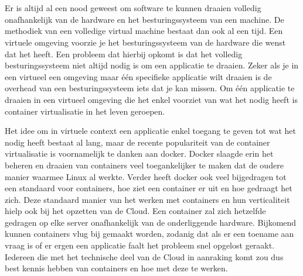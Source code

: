 
\chapter{}
\label{ch:inleiding}

Er is altijd al een nood geweest om software te kunnen draaien volledig onafhankelijk van de hardware en het besturingssysteem van een machine. De methodiek van een volledige virtual machine bestaat dan ook al een tijd. Een virtuele omgeving voorzie je het besturingssysteem van de hardware die wenst dat het heeft. Een probleem dat hierbij opkomt is dat het volledig besturingssysteem niet altijd nodig is om een applicatie te draaien.  Zeker als je in een virtueel een omgeving maar één specifieke applicatie wilt draaien is de overhead van een besturingssysteem iets dat je kan missen.  Om één applicatie te draaien in een virtueel omgeving die het enkel voorziet van wat het nodig heeft is container virtualisatie in het leven geroepen.
 
Het idee om in virtuele context een applicatie enkel toegang te geven tot wat het nodig heeft bestaat al lang, maar de recente populariteit van de container virtualisatie is voornamelijk te danken aan docker.  Docker slaagde erin het beheren en draaien van containers veel toegankelijker te maken dat de oudere manier waarmee Linux al werkte.  Verder heeft docker ook veel bijgedragen tot een standaard voor containers, hoe ziet een container er uit en hoe gedraagt het zich.  Deze standaard manier van het werken met containers en hun verticaliteit hielp ook bij het opzetten van de Cloud. Een container zal zich hetzelfde gedragen op elke server onafhankelijk van de onderliggende hardware. Bijkomend kunnen containers vlug bij gemaakt worden, zodanig dat als er een toename aan vraag is of er ergen een applicatie faalt het probleem snel opgelost geraakt. Iedereen die met het technische deel van de Cloud in aanraking komt zou dus best kennis hebben van containers en hoe met deze te werken.


\section{}
\label{sec:probleemstelling}

